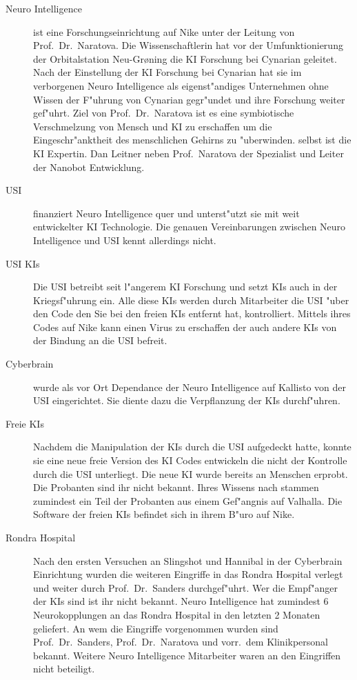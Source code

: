 \begin{description}
	\item[Neuro Intelligence] ist eine Forschungseinrichtung auf Nike unter der Leitung von Prof.~Dr.~Naratova. Die Wissenschaftlerin hat 
		vor der Umfunktionierung der Orbitalstation Neu-Gr{\o}ning die KI Forschung bei Cynarian geleitet. Nach der Einstellung der KI Forschung bei Cynarian hat sie im verborgenen Neuro Intelligence als eigenst"andiges Unternehmen ohne Wissen der F"uhrung von Cynarian gegr"undet und ihre Forschung weiter gef"uhrt. Ziel von Prof.~Dr.~Naratova ist es eine symbiotische Verschmelzung von Mensch und KI zu erschaffen um die Eingeschr"anktheit des menschlichen Gehirns zu "uberwinden. \ml{} selbst ist die KI Expertin. Dan Leitner neben Prof.~Naratova der Spezialist und Leiter der Nanobot Entwicklung.
	\item[USI] finanziert Neuro Intelligence quer und unterst"utzt sie mit weit entwickelter KI Technologie. Die genauen Vereinbarungen 
		zwischen Neuro Intelligence und USI kennt \ml{} allerdings nicht.
    \item[USI KIs] Die USI betreibt seit l"angerem KI Forschung und setzt KIs auch in der Kriegsf"uhrung ein. Alle diese KIs werden 
		durch Mitarbeiter die USI "uber den Code den Sie bei den freien KIs entfernt hat, kontrolliert. Mittels ihres Codes auf Nike kann \ml{} einen Virus zu erschaffen der auch andere KIs von der Bindung an die USI befreit.		
	\item[Cyberbrain] wurde als vor Ort Dependance der Neuro Intelligence auf Kallisto von der USI eingerichtet. Sie diente dazu die		
		Verpflanzung der KIs durchf"uhren.
	\item[Freie KIs] Nachdem \ml{} die Manipulation der KIs durch die USI aufgedeckt hatte, konnte sie eine neue freie Version des KI Codes
		entwickeln die nicht der Kontrolle durch die USI unterliegt. Die neue KI wurde bereits an Menschen erprobt. Die Probanten sind ihr nicht bekannt. Ihres Wissens nach stammen zumindest ein Teil der Probanten aus einem Gef"angnis auf Valhalla. Die Software der freien KIs befindet sich in ihrem B"uro auf Nike.
	\item[Rondra Hospital] Nach den ersten Versuchen an Slingshot und Hannibal in der Cyberbrain Einrichtung wurden die weiteren Eingriffe 	
		in das Rondra Hospital verlegt und weiter durch Prof.~Dr.~Sanders durchgef"uhrt. Wer die Empf"anger der KIs sind ist ihr nicht bekannt. Neuro Intelligence hat zumindest 6 Neurokopplungen an das Rondra Hospital in den letzten 2 Monaten geliefert. An wem die Eingriffe vorgenommen wurden sind Prof.~Dr.~Sanders, Prof.~Dr.~Naratova und vorr.~dem Klinikpersonal bekannt. Weitere Neuro Intelligence Mitarbeiter waren an den Eingriffen nicht beteiligt.
\end{description}

